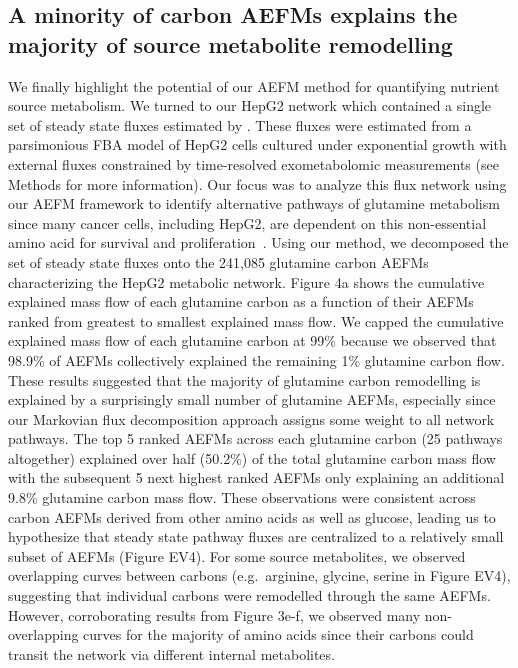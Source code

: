 \documentclass[12pt]{article}
\begin{document}
\subsection*{A minority of carbon AEFMs explains the majority of source metabolite remodelling}


We finally highlight the potential of our AEFM method for quantifying
nutrient source metabolism. We turned to our HepG2 network which contained
a single set of steady state fluxes estimated by
\citeauthor{NilssonAvlant2020Qaoa}. These fluxes were estimated from
a parsimonious FBA model of HepG2 cells cultured under exponential growth
with external fluxes constrained by time-resolved exometabolomic
measurements (see Methods for more information). Our focus was to analyze
this flux network using our AEFM framework to identify alternative
pathways of glutamine metabolism since many cancer cells, including HepG2,
are dependent on this non-essential amino acid for survival and
proliferation~\citep{YeYanyan2023Gmri,YooHeeChan2020Gric}. Using our
method, we decomposed the set of steady state fluxes onto the 241,085
glutamine carbon AEFMs characterizing the HepG2 metabolic network. Figure
4a shows the cumulative explained mass flow of each glutamine carbon as
a function of their AEFMs ranked from greatest to smallest explained mass
flow. We capped the cumulative explained mass flow of each glutamine
carbon at 99\% because we observed that 98.9\% of AEFMs collectively
explained the remaining 1\% glutamine carbon flow. These results suggested
that the majority of glutamine carbon remodelling is explained by
a surprisingly small number of glutamine AEFMs, especially since our
Markovian flux decomposition approach assigns some weight to all network
pathways. The top 5 ranked AEFMs across each glutamine carbon (25 pathways
altogether) explained over half (50.2\%) of the total glutamine carbon
mass flow with the subsequent 5 next highest ranked AEFMs only explaining
an additional 9.8\% glutamine carbon mass flow. These observations were
consistent across carbon AEFMs derived from other amino acids as well as
glucose, leading us to hypothesize that steady state pathway fluxes are
centralized to a relatively small subset of AEFMs (Figure EV4). For some
source metabolites, we observed overlapping curves between carbons (e.g.\
arginine, glycine, serine in Figure EV4), suggesting that individual
carbons were remodelled through the same AEFMs. However, corroborating
results from Figure 3e-f, we observed many non-overlapping curves for the
majority of amino acids since their carbons could transit the network via
different internal metabolites.
\end{document}
